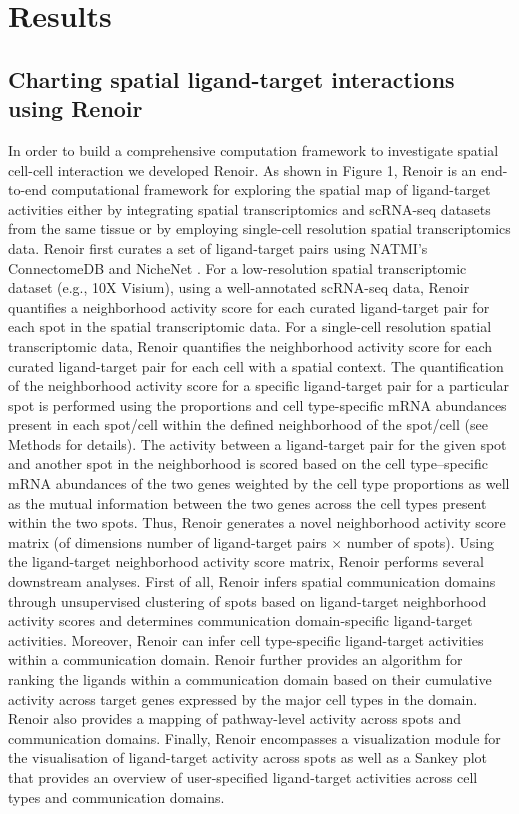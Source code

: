 \section*{Results}\label{section: result}
\subsection*{Charting spatial ligand-target interactions using Renoir}
In order to build a comprehensive computation framework to investigate spatial cell-cell interaction we developed Renoir. As shown in Figure 1, Renoir is an end-to-end computational framework for exploring the spatial map of ligand-target activities either by integrating spatial transcriptomics and scRNA-seq datasets from the same tissue or by employing single-cell resolution spatial transcriptomics data. Renoir first curates a set of ligand-target pairs using NATMI's ConnectomeDB \citep{Hou2020} and NicheNet \citep{Browaeys2020}. For a low-resolution spatial transcriptomic dataset (e.g., 10X Visium), using a well-annotated scRNA-seq data, Renoir quantifies a neighborhood activity score for each curated ligand-target pair for each spot in the spatial transcriptomic data. For a single-cell resolution spatial transcriptomic data, Renoir quantifies the neighborhood activity score for each curated ligand-target pair for each cell with a spatial context. The quantification of the neighborhood activity score for a specific ligand-target pair for a particular spot is performed using the proportions and cell type-specific mRNA abundances present in each spot/cell within the defined neighborhood of the spot/cell (see Methods for details). The activity between a ligand-target pair for the given spot and another spot in the neighborhood is scored based on the cell type–specific mRNA abundances of the two genes weighted by the cell type proportions as well as the mutual information between the two genes across the cell types present within the two spots. Thus, Renoir generates a novel neighborhood activity score matrix (of dimensions number of ligand-target pairs $\times$ number of spots). Using the ligand-target neighborhood activity score matrix, Renoir performs several downstream analyses. First of all, Renoir infers spatial communication domains through unsupervised clustering of spots based on ligand-target neighborhood activity scores and determines communication domain-specific ligand-target activities. Moreover, Renoir can infer cell type-specific ligand-target activities within a communication domain. Renoir further provides an algorithm for ranking the ligands within a communication domain based on their cumulative activity across target genes expressed by the major cell types in the domain. Renoir also provides a mapping of pathway-level activity across spots and communication domains. Finally, Renoir encompasses a visualization module for the visualisation of ligand-target activity across spots as well as a Sankey plot that provides an overview of user-specified ligand-target activities across cell types and communication domains.

